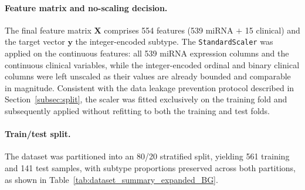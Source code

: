 \paragraph{Feature matrix and no-scaling decision.}
The final feature matrix $\mathbf{X}$ comprises 554 features (539 miRNA $+$ 15 
clinical) and the target vector $\mathbf{y}$ the integer-encoded subtype. The 
\texttt{StandardScaler} was applied on the continuous features: all 539 miRNA 
expression columns and the continuous clinical variables, while the 
integer-encoded ordinal and binary clinical columns were left unscaled as their 
values are already bounded and comparable in magnitude. Consistent with the 
data leakage prevention protocol described in Section~\ref{subsec:split}, the scaler was fitted 
exclusively on the training fold and subsequently applied without refitting to 
both the training and test folds.

\paragraph{Train/test split.}
The dataset was partitioned into an 80/20 stratified split, yielding 561 training and 141 test samples, with subtype proportions
preserved across both partitions, as shown in Table~\ref{tab:dataset_summary_expanded_BG}.

